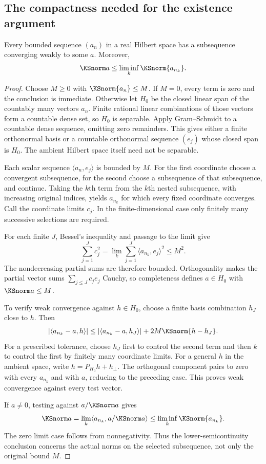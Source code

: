 \subsection{The compactness needed for the existence argument}
\begin{KSlemma}\label{KS:lem:weak-subsequence}
Every bounded sequence $(a_n)$ in a real Hilbert space has a subsequence converging weakly to some $a$. Moreover,
\[
 \KSnorm a\le\liminf_k\KSnorm{a_{n_k}}.
\]
\end{KSlemma}
\begin{proof}
Choose $M\ge0$ with $\KSnorm{a_n}\le M$. If $M=0$, every term is zero and the conclusion is immediate. Otherwise let $H_0$ be the closed linear span of the countably many vectors $a_n$. Finite rational linear combinations of those vectors form a countable dense set, so $H_0$ is separable. Apply Gram--Schmidt to a countable dense sequence, omitting zero remainders. This gives either a finite orthonormal basis or a countable orthonormal sequence $(e_j)$ whose closed span is $H_0$. The ambient Hilbert space itself need not be separable.

Each scalar sequence $\langle a_n,e_j\rangle$ is bounded by $M$. For the first coordinate choose a convergent subsequence, for the second choose a subsequence of that subsequence, and continue. Taking the $k$th term from the $k$th nested subsequence, with increasing original indices, yields $a_{n_k}$ for which every fixed coordinate converges. Call the coordinate limits $c_j$. In the finite-dimensional case only finitely many successive selections are required.

For each finite $J$, Bessel's inequality and passage to the limit give
\[
 \sum_{j=1}^Jc_j^2
 =\lim_k\sum_{j=1}^J\langle a_{n_k},e_j\rangle^2\le M^2.
\]
The nondecreasing partial sums are therefore bounded. Orthogonality makes the partial vector sums $\sum_{j\le J}c_je_j$ Cauchy, so completeness defines $a\in H_0$ with $\KSnorm a\le M$.

To verify weak convergence against $h\in H_0$, choose a finite basis combination $h_J$ close to $h$. Then
\[
 |\langle a_{n_k}-a,h\rangle|
 \le |\langle a_{n_k}-a,h_J\rangle|
      +2M\KSnorm{h-h_J}.
\]
For a prescribed tolerance, choose $h_J$ first to control the second term and then $k$ to control the first by finitely many coordinate limits. For a general $h$ in the ambient space, write $h=P_{H_0}h+h_\perp$. The orthogonal component pairs to zero with every $a_{n_k}$ and with $a$, reducing to the preceding case. This proves weak convergence against every test vector.

If $a\ne0$, testing against $a/\KSnorm a$ gives
\[
 \KSnorm a=\lim_k\langle a_{n_k},a/\KSnorm a\rangle
 \le\liminf_k\KSnorm{a_{n_k}}.
\]
The zero limit case follows from nonnegativity. Thus the lower-semicontinuity conclusion concerns the actual norms on the selected subsequence, not only the original bound $M$.
\end{proof}

